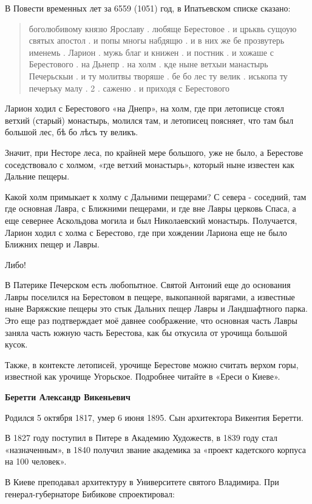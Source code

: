 В Повести временных лет за 6559 (1051) год, в Ипатьевском списке сказано:

\begin{quotation}
боголюбивому князю Ярославу . любяще Берестовое . и црьквь сущоую святых апостол . и попы многы набдящю . и в них же бе прозвутерь именемь . Ларион . мужь благ и книжен . и постник . и хожаше с Берестового . на Дьнепр . на холм . кде ныне ветхыи манастырь Печерьскыи . и ту молитвы творяше . бе бо лес ту велик . иськопа ту печеръку малу . 2 . саженю . и приходя с Берестового
\end{quotation}

Ларион ходил с Берестового «на Днепр», на холм, где при летописце стоял ветхий (старый) монастырь, молился там, и летописец поясняет, что там был большой лес, бѣ бо лѣсъ ту великъ.

Значит, при Несторе леса, по крайней мере большого, уже не было, а Берестове соседствовало с холмом, «где ветхий монастырь», который ныне известен как Дальние пещеры.

Какой холм примыкает к холму с Дальними пещерами? С севера - соседний, там где основная Лавра, с Ближними пещерами, и где вне Лавры церковь Спаса, а еще севернее Аскольдова могила и был Николаевский монастырь. Получается, Ларион ходил с холма с Берестово, где при хождении Лариона еще не было Ближних пещер и Лавры. 

Либо! 

В Патерике Печерском есть любопытное. Святой Антоний еще до основания Лавры поселился на Берестовом в пещере, выкопанной варягами, а известные ныне Варяжские пещеры это стык Дальних пещер Лавры и Ландшафтного парка. Это еще раз подтверждает моё давнее соображение, что основная часть Лавры заняла часть южную часть Берестова, как бы откусила от урочища большой кусок.

Также, в контексте летописей, урочище Берестове можно считать верхом горы, известной как урочище Угорьское. Подробнее читайте в «Ереси о Киеве».\\

\medskip


\textbf{Беретти Александр Викеньевич}

Родился 5 октября 1817, умер 6 июня 1895. Сын архитектора Викентия Беретти.

В 1827 году поступил в Питере в Академию Художеств, в 1839 году стал «назначенным», в 1840 получил звание академика за «проект кадетского корпуса на 100 человек».

В Киеве преподавал архитектуру в Университете святого Владимира. При генерал-губер\-наторе Бибикове спроектировал:

